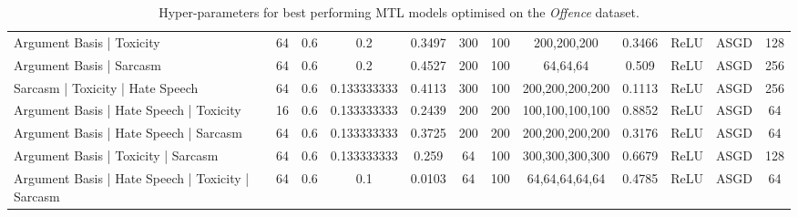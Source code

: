 {\begin{landscape}
\begin{table}[]
{\begin{tabular}{l|ccccccccccc}
      Argument Basis | Toxicity                         & 64         & 0.6              & 0.2              & 0.3497  & 300           & 100    & 200,200,200     & 0.3466        & ReLU          & ASGD      & 128        \\
      Argument Basis | Sarcasm                          & 64         & 0.6              & 0.2              & 0.4527  & 200           & 100    & 64,64,64        & 0.509         & ReLU          & ASGD      & 256        \\
      Sarcasm | Toxicity | Hate Speech                  & 64         & 0.6              & 0.133333333      & 0.4113  & 300           & 100    & 200,200,200,200 & 0.1113        & ReLU          & ASGD      & 256        \\
      Argument Basis | Hate Speech | Toxicity           & 16         & 0.6              & 0.133333333      & 0.2439  & 200           & 200    & 100,100,100,100 & 0.8852        & ReLU          & ASGD      & 64         \\
      Argument Basis | Hate Speech | Sarcasm            & 64         & 0.6              & 0.133333333      & 0.3725  & 200           & 200    & 200,200,200,200 & 0.3176        & ReLU          & ASGD      & 64         \\
      Argument Basis | Toxicity | Sarcasm               & 64         & 0.6              & 0.133333333      & 0.259   & 64            & 100    & 300,300,300,300 & 0.6679        & ReLU          & ASGD      & 128        \\
      Argument Basis | Hate Speech | Toxicity | Sarcasm & 64         & 0.6              & 0.1              & 0.0103  & 64            & 100    & 64,64,64,64,64  & 0.4785        & ReLU          & ASGD      & 64
    \end{tabular}%
    }
    \caption{Hyper-parameters for best performing MTL models optimised on the \textit{Offence} dataset.}
    \label{tab:mtl_params_davidson}
  \end{table}
  \vfill  
  \begin{table}[]
    \centering
\end{table}
\end{landscape}}
